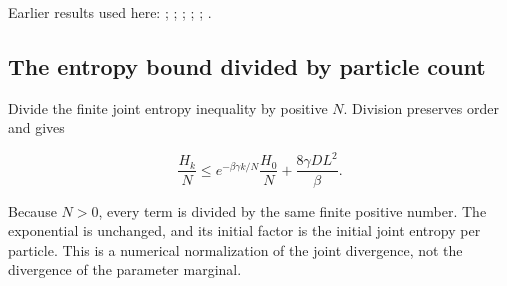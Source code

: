 \documentclass[11pt,a4paper]{report}
\begin{document}
Earlier results used here: \cite[Section~3.1.3]{LangevinLean2026ULALSI}; \cite[Section~3.29.7]{LangevinLean2026ULALSI}; \cite[Section~3.1.1]{LangevinLean2026IPLA}; \cite[Section~3.1.3]{LangevinLean2026IPLA}; \cite[Section~3.1.4]{LangevinLean2026IPLA}; \cite[Section~3.3.2]{LangevinLean2026IPLA}.
\subsection{\texorpdfstring{The entropy bound divided by particle count}{The entropy bound divided by particle count}}
\label{report-step-IPLA-LSI-UnconditionalTheorem-lean-2}


Divide the finite joint entropy inequality by positive \(N\). Division preserves order and gives

\[\frac{H_k}{N}\le e^{-\beta\gamma k/N}\frac{H_0}{N}+\frac{8\gamma D L^2}{\beta}.\]

Because \(N>0\), every term is divided by the same finite positive number. The exponential is unchanged, and its initial factor is the initial joint entropy per particle. This is a numerical normalization of the joint divergence, not the divergence of the parameter marginal.
\end{document}
